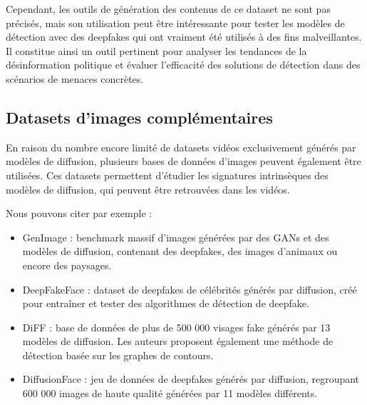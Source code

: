 \documentclass[runningheads]{llncs}
\begin{document}
Cependant, les outils de génération des contenus de ce dataset ne sont pas précisés, mais son utilisation peut être intéressante pour tester les modèles de détection avec des deepfakes qui ont vraiment été utilisés à des fins malveillantes. Il constitue ainsi un outil pertinent pour analyser les tendances de la désinformation politique et évaluer l'efficacité des solutions de détection dans des scénarios de menaces concrètes. 

\subsection{Datasets d’images complémentaires}

En raison du nombre encore limité de datasets vidéos exclusivement générés par modèles de diffusion, plusieurs bases de données d’images peuvent également être utilisées. Ces datasets permettent d’étudier les signatures intrinsèques des modèles de diffusion, qui peuvent être retrouvées dans les vidéos.

Nous pouvons citer par exemple :
\begin{itemize}
    \item GenImage \citep{zhu2023genimage} : benchmark massif d'images générées par des GANs et des modèles de diffusion, contenant des deepfakes, des images d'animaux ou encore des paysages.
    \item DeepFakeFace \citep{song} : dataset de deepfakes de célébrités générés par diffusion, créé pour entraîner et tester des algorithmes de détection de deepfake.
    \item DiFF \citep{cheng} : base de données de plus de 500 000 visages fake générés par 13 modèles de diffusion. Les auteurs proposent également une méthode de détection basée sur les graphes de contours.
    \item DiffusionFace \citep{chen} : jeu de données de deepfakes générés par diffusion, regroupant 600 000 images de haute qualité générées par 11 modèles différents.
\end{itemize}



\newpage


\end{document}
